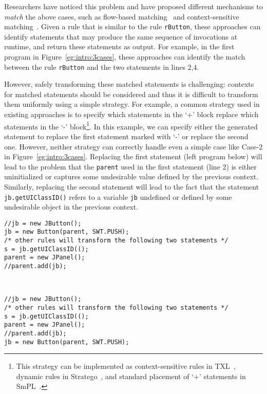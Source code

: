 \documentclass[a4paper, USenglish]{lipics-v2016}
\newenvironment{smpage}[1]
{\begin{lrbox}{\fmbox}\begin{minipage}{#1}}
{\end{minipage}\end{lrbox}\usebox{\fmbox}}
\newcommand{\code}[1]{\texttt{\footnotesize #1}}
\theoremstyle{plain}
\begin{document}
Researchers have noticed this
problem and have proposed different
mechanisms to \emph{match} the above cases, such as flow-based
matching~\cite{DBLP:conf/popl/BrunelDHLM09} and context-sensitive matching~\cite{Cordy:2006:TST:1149670.1149672}.
Given a rule that is similar to the rule \code{rButton}, these approaches can identify
statements that may produce the same sequence of invocations at
runtime, and return these statements as output. For example, in the
first program in Figure~\ref{eg:intro:3cases}, these approaches can identify the match between the rule \code{rButton} and the two statements in lines 2,4.

However, safely transforming these matched statements is challenging: contexts for matched statements should be considered and thus it is difficult to transform them uniformly using a simple strategy.
For example,
  a common strategy used in existing approaches is to specify which
statements in the `+' block replace which statements in the `-'
block\footnote{This strategy can be implemented as context-sensitive rules
  in TXL~\cite{Cordy:2006:TST:1149670.1149672}, dynamic rules in Stratego~\cite{Bravenboer:2008:SLT:1385689.1385715}, and
  standard placement of `+' statements in SmPL~\cite{DBLP:conf/eurosys/PadioleauLHM08}.}.
In this example, we can specify either the generated statement to
replace the first statement marked with `-' or replace the second one.
However, neither strategy can correctly handle even a simple case like Case-2 in
Figure~\ref{eg:intro:3cases}. Replacing the first statement (left
program below) will lead to the problem that the \code{parent} used
in the first statement (line 2) is either uninitialized or captures some
undesirable value defined by the previous context.
Similarly, replacing the second statement
will lead to the fact that the statement \code{jb.getUIClassID()}
refers to a variable \code{jb} undefined or defined by some
undesirable object in the previous context.

\begin{center}
\begin{smpage}{0.4\columnwidth}
\begin{lstlisting}[style=patl,frame=none, basicstyle=\scriptsize\ttfamily]
//jb = new JButton();
jb = new Button(parent, SWT.PUSH);
/* other rules will transform the following two statements */
s = jb.getUIClassID(();
parent = new JPanel();
//parent.add(jb);
\end{lstlisting}
\end{smpage}
~~
\begin{smpage}{0.4\columnwidth}
\begin{lstlisting}[style=patl,frame=none, basicstyle=\scriptsize\ttfamily]
//jb = new JButton();
/* other rules will transform the following two statements */
s = jb.getUIClassID(();
parent = new JPanel();
//parent.add(jb);
jb = new Button(parent, SWT.PUSH);
\end{lstlisting}
\end{smpage}
\end{center}
\end{document}
